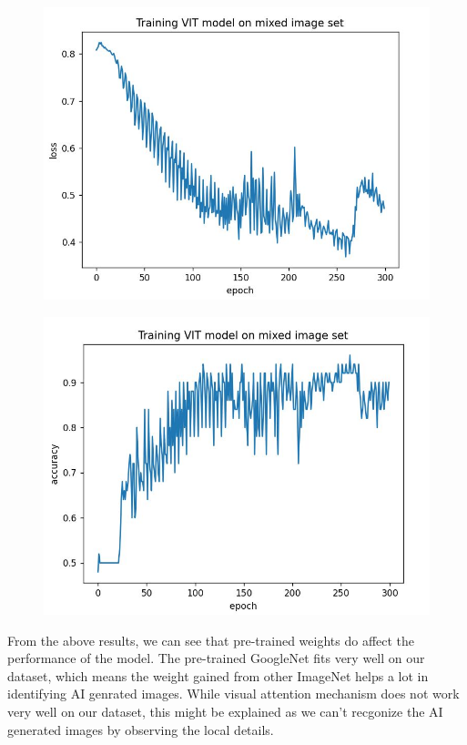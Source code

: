 \documentclass[conference]{IEEEtran}
\begin{document}
\begin{figure}[h]
  \centering
    \begin{minipage}{.24\textwidth}
      \centering
      \includegraphics[width=0.9\linewidth]{ViT_ganyu_loss.jpg}
      \label{fig:test1}
    \end{minipage}%
    \begin{minipage}{.24\textwidth}
      \centering
      \includegraphics[width=0.9\linewidth]{ViT_ganyu_accuracy.jpg}
      \label{fig:test2}
    \end{minipage}
\end{figure}

From the above results, we can see that pre-trained weights do affect the performance of the model. The pre-trained GoogleNet fits very well on our dataset, which means the weight gained from other ImageNet helps a lot in identifying AI genrated images. While visual attention mechanism does not work
very well on our dataset, this might be explained as we can't recgonize the AI generated images by observing the local details.
\end{document}
